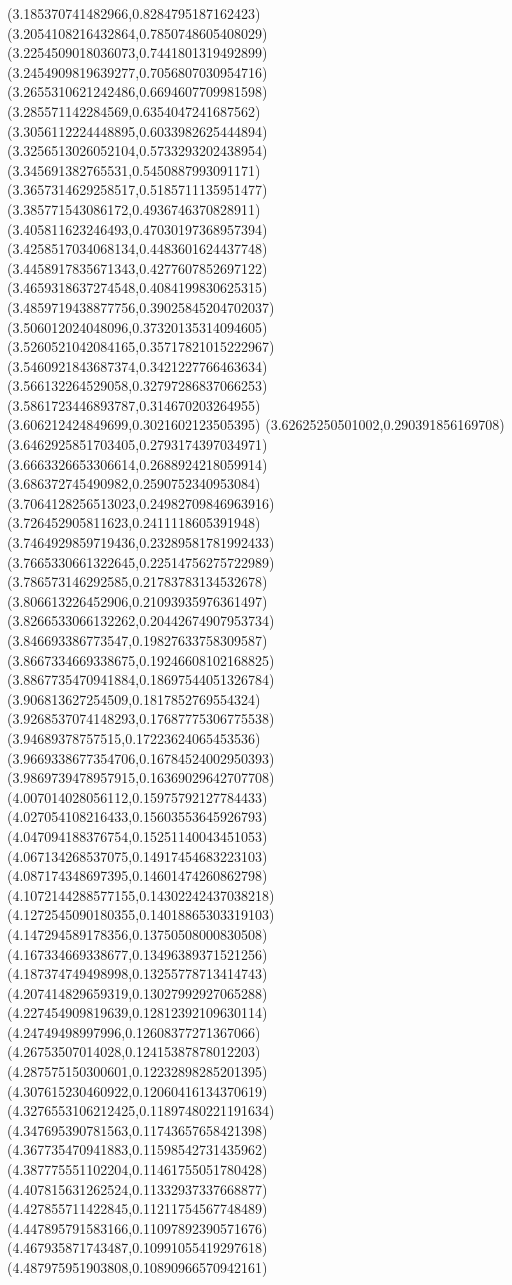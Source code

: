 {(3.185370741482966,0.8284795187162423)
(3.2054108216432864,0.7850748605408029)
(3.2254509018036073,0.7441801319492899)
(3.2454909819639277,0.7056807030954716)
(3.2655310621242486,0.6694607709981598)
(3.285571142284569,0.6354047241687562)
(3.3056112224448895,0.6033982625444894)
(3.3256513026052104,0.5733293202438954)
(3.345691382765531,0.5450887993091171)
(3.3657314629258517,0.5185711135951477)
(3.385771543086172,0.4936746370828911)
(3.405811623246493,0.47030197368957394)
(3.4258517034068134,0.4483601624437748)
(3.4458917835671343,0.4277607852697122)
(3.4659318637274548,0.4084199830625315)
(3.4859719438877756,0.39025845204702037)
(3.506012024048096,0.37320135314094605)
(3.5260521042084165,0.35717821015222967)
(3.5460921843687374,0.3421227766463634)
(3.566132264529058,0.32797286837066253)
(3.5861723446893787,0.314670203264955)
(3.606212424849699,0.3021602123505395)
(3.62625250501002,0.290391856169708)
(3.6462925851703405,0.2793174397034971)
(3.6663326653306614,0.2688924218059914)
(3.686372745490982,0.2590752340953084)
(3.7064128256513023,0.24982709846963916)
(3.726452905811623,0.2411118605391948)
(3.7464929859719436,0.23289581781992433)
(3.7665330661322645,0.22514756275722989)
(3.786573146292585,0.21783783134532678)
(3.806613226452906,0.21093935976361497)
(3.8266533066132262,0.20442674907953734)
(3.846693386773547,0.19827633758309587)
(3.8667334669338675,0.19246608102168825)
(3.8867735470941884,0.18697544051326784)
(3.906813627254509,0.1817852769554324)
(3.9268537074148293,0.17687775306775538)
(3.94689378757515,0.17223624065453536)
(3.9669338677354706,0.16784524002950393)
(3.9869739478957915,0.16369029642707708)
(4.007014028056112,0.15975792127784433)
(4.027054108216433,0.15603553645926793)
(4.047094188376754,0.15251140043451053)
(4.067134268537075,0.14917454683223103)
(4.087174348697395,0.14601474260862798)
(4.1072144288577155,0.14302242437038218)
(4.1272545090180355,0.14018865303319103)
(4.147294589178356,0.13750508000830508)
(4.167334669338677,0.13496389371521256)
(4.187374749498998,0.13255778713414743)
(4.207414829659319,0.13027992927065288)
(4.227454909819639,0.12812392109630114)
(4.24749498997996,0.12608377271367066)
(4.26753507014028,0.12415387878012203)
(4.287575150300601,0.12232898285201395)
(4.307615230460922,0.12060416134370619)
(4.3276553106212425,0.11897480221191634)
(4.347695390781563,0.11743657658421398)
(4.367735470941883,0.11598542731435962)
(4.387775551102204,0.11461755051780428)
(4.407815631262524,0.11332937337668877)
(4.427855711422845,0.11211754567748489)
(4.447895791583166,0.11097892390571676)
(4.467935871743487,0.10991055419297618)
(4.487975951903808,0.10890966570942161)
}
